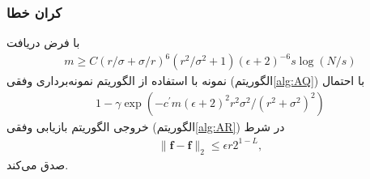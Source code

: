 \begin{frame}
\frametitle{کران خطا}
\begin{theorem}
با فرض دریافت
\begin{align}
 m \geq C(r/\sigma+\sigma / r)^{6}(r^{2}/\sigma^2+1)(\epsilon+2)^{-6}s \log (N/s) 
\end{align} 
نمونه با استفاده از الگوریتم نمونه‌برداری وفقی
(الگوریتم\ref{alg:AQ})
با احتمال 
\begin{align}
 1-\gamma \exp{(-c^{\prime}m (\epsilon+2)^{2} r^2\sigma^2/ (r^2+\sigma^2)^2)} 
\end{align}
خروجی الگوریتم بازیابی وفقی
(الگوریتم\ref{alg:AR}) 
در شرط  
\begin{align}
\|\bm{f}-\hat{\bm{f}}\|_{2}\leq \epsilon r2^{1-L},
\end{align}
صدق می‌کند.
\end{theorem}

\end{frame}
